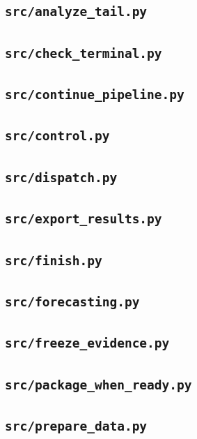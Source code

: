 \subsection{\texttt{src/analyze\_tail.py}}
\subsection{\texttt{src/check\_terminal.py}}
\subsection{\texttt{src/continue\_pipeline.py}}
\subsection{\texttt{src/control.py}}
\subsection{\texttt{src/dispatch.py}}
\subsection{\texttt{src/export\_results.py}}
\subsection{\texttt{src/finish.py}}
\subsection{\texttt{src/forecasting.py}}
\subsection{\texttt{src/freeze\_evidence.py}}
\subsection{\texttt{src/package\_when\_ready.py}}
\subsection{\texttt{src/prepare\_data.py}}

